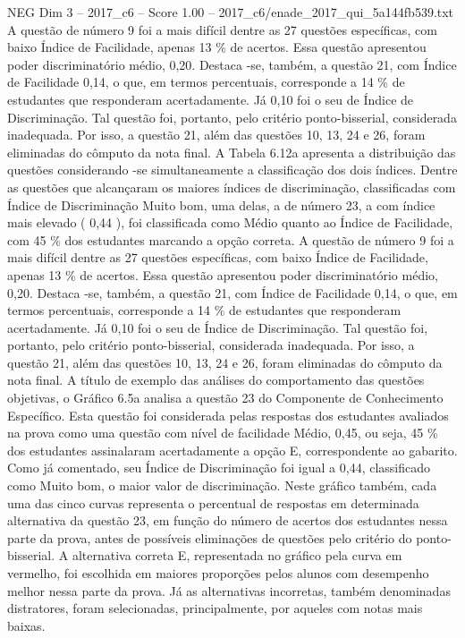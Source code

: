 \begin{textsample}{NEG Dim 3 – 2017\_c6 – Score 1.00 – 2017\_c6/enade\_2017\_qui\_5a144fb539.txt}
A questão de número 9 foi a mais difícil dentre as 27 questões específicas, com baixo Índice de Facilidade, apenas 13 \% de acertos.
Essa questão apresentou poder discriminatório médio, 0,20.
Destaca -se, também, a questão 21, com Índice de Facilidade 0,14, o que, em termos percentuais, corresponde a 14 \% de estudantes que responderam acertadamente.
Já 0,10 foi o seu de Índice de Discriminação.
Tal questão foi, portanto, pelo critério ponto-bisserial, considerada inadequada.
Por isso, a questão 21, além das questões 10, 13, 24 e 26, foram eliminadas do cômputo da nota final.
A Tabela 6.12a apresenta a distribuição das questões considerando -se simultaneamente a classificação dos dois índices.
Dentre as questões que alcançaram os maiores índices de discriminação, classificadas com Índice de Discriminação Muito bom, uma delas, a de número 23, a com índice mais elevado ( 0,44 ), foi classificada como Médio quanto ao Índice de Facilidade, com 45 \% dos estudantes marcando a opção correta.
A questão de número 9 foi a mais difícil dentre as 27 questões específicas, com baixo Índice de Facilidade, apenas 13 \% de acertos.
Essa questão apresentou poder discriminatório médio, 0,20.
Destaca -se, também, a questão 21, com Índice de Facilidade 0,14, o que, em termos percentuais, corresponde a 14 \% de estudantes que responderam acertadamente.
Já 0,10 foi o seu de Índice de Discriminação.
Tal questão foi, portanto, pelo critério ponto-bisserial, considerada inadequada.
Por isso, a questão 21, além das questões 10, 13, 24 e 26, foram eliminadas do cômputo da nota final.
A título de exemplo das análises do comportamento das questões objetivas, o Gráfico 6.5a analisa a questão 23 do Componente de Conhecimento Específico.
Esta questão foi considerada pelas respostas dos estudantes avaliados na prova como uma questão com nível de facilidade Médio, 0,45, ou seja, 45 \% dos estudantes assinalaram acertadamente a opção E, correspondente ao gabarito.
Como já comentado, seu Índice de Discriminação foi igual a 0,44, classificado como Muito bom, o maior valor de discriminação.
Neste gráfico também, cada uma das cinco curvas representa o percentual de respostas em determinada alternativa da questão 23, em função do número de acertos dos estudantes nessa parte da prova, antes de possíveis eliminações de questões pelo critério do ponto-bisserial.
A alternativa correta E, representada no gráfico pela curva em vermelho, foi escolhida em maiores proporções pelos alunos com desempenho melhor nessa parte da prova.
Já as alternativas incorretas, também denominadas distratores, foram selecionadas, principalmente, por aqueles com notas mais baixas.

\end{textsample}
